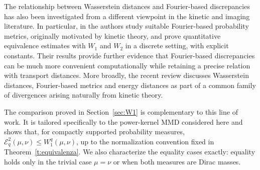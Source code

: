 \documentclass[12pt,a4paper,oneside]{amsart}
\theoremstyle{plain}
\theoremstyle{definition}
\numberwithin{equation}{section}
\numberwithin{figure}{section}
\numberwithin{table}{section}
\theoremstyle{remark}
\begin{document}
 The relationship between Wasserstein distances and Fourier-based discrepancies has
also been investigated from a different viewpoint in the kinetic and imaging
literature. In particular, in
\cite{Auricchio2020} the authors study suitable Fourier-based
probability metrics, originally motivated by kinetic theory, and prove quantitative
equivalence estimates with $W_1$ and $W_2$ in a discrete setting, with explicit
constants. Their results provide further evidence that Fourier-based discrepancies
can be much more convenient computationally while retaining a precise relation with
transport distances. More broadly, the recent review
\cite{auricchio2026kinetic} discusses Wasserstein distances, Fourier-based metrics
and energy distances as part of a common family of divergences arising naturally
from kinetic theory.

The comparison proved in Section~\ref{sec:W1} is complementary to this line of
work. It is tailored specifically to the power-kernel MMD considered here and shows
that, for compactly supported probability measures,
$\mathcal E_q^2(\mu,\nu)\leq W_1^q(\mu,\nu)$, up to the normalization convention
fixed in Theorem~\ref{t:equivalenza}. We also characterize the equality cases
exactly: equality holds only in the trivial case $\mu=\nu$ or when both measures are
Dirac masses.
\end{document}
